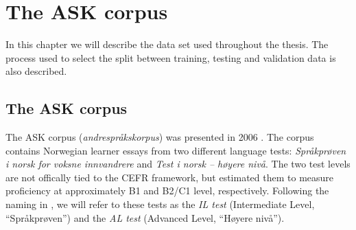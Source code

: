 \chapter{The ASK corpus}

In this chapter we will describe the data set used throughout the thesis. The
process used to select the split between training, testing and validation
data is also described.


\section{The ASK corpus}

The ASK corpus (\emph{andrespråkskorpus}) was presented in 2006
\autocite{tenfjord06}. The corpus contains Norwegian learner essays from two
different language tests: \emph{Språkprøven i norsk for voksne innvandrere}
and \emph{Test i norsk – høyere nivå}. The two test levels are not offically
tied to the CEFR framework, but \textcite{carlsen2012proficiency} estimated
them to measure proficiency at approximately B1 and B2/C1 level,
respectively. Following the naming in \textcite{carlsen2012proficiency}, we
will refer to these tests as the \emph{IL test} (Intermediate Level,
``Språkprøven'') and the \emph{AL test} (Advanced Level, ``Høyere nivå'').

